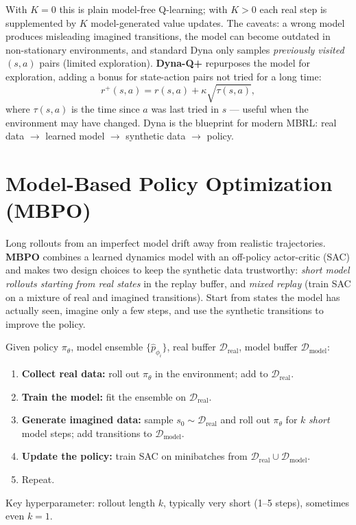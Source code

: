 \documentclass[11pt, oneside]{book}
\newcommand{\dataset}{\mathcal{D}}       %
\begin{document}
With $K=0$ this is plain model-free Q-learning; with $K>0$ each real step is supplemented by
$K$ model-generated value updates. The caveats: a wrong model produces misleading imagined
transitions, the model can become outdated in non-stationary environments, and standard Dyna
only samples \emph{previously visited} $(s,a)$ pairs (limited exploration).
\textbf{Dyna-Q+} repurposes the model for exploration, adding a bonus for state-action pairs
not tried for a long time:
\[
  r^+(s,a) = r(s,a) + \kappa\sqrt{\tau(s,a)},
\]
where $\tau(s,a)$ is the time since $a$ was last tried in $s$ --- useful when the
environment may have changed. Dyna is the blueprint for modern MBRL: real data $\to$
learned model $\to$ synthetic data $\to$ policy.

\section{Model-Based Policy Optimization (MBPO)}

Long rollouts from an imperfect model drift away from realistic trajectories. \textbf{MBPO}
combines a learned dynamics model with an off-policy actor-critic (SAC) and makes two design
choices to keep the synthetic data trustworthy: \emph{short model rollouts starting from
real states} in the replay buffer, and \emph{mixed replay} (train SAC on a mixture of real
and imagined transitions). Start from states the model has actually seen, imagine only a
few steps, and use the synthetic transitions to improve the policy.

\begin{thmbox}[title={MBPO}]
Given policy $\pi_\theta$, model ensemble $\{\hat p_{\phi_i}\}$, real buffer
$\dataset_{\text{real}}$, model buffer $\dataset_{\text{model}}$:
\begin{enumerate}
  \item \textbf{Collect real data:} roll out $\pi_\theta$ in the environment; add to
    $\dataset_{\text{real}}$.
  \item \textbf{Train the model:} fit the ensemble on $\dataset_{\text{real}}$.
  \item \textbf{Generate imagined data:} sample $s_0\sim\dataset_{\text{real}}$ and roll out
    $\pi_\theta$ for $k$ \emph{short} model steps; add transitions to $\dataset_{\text{model}}$.
  \item \textbf{Update the policy:} train SAC on minibatches from
    $\dataset_{\text{real}}\cup\dataset_{\text{model}}$.
  \item Repeat.
\end{enumerate}
Key hyperparameter: rollout length $k$, typically very short (1--5 steps), sometimes even
$k=1$.
\end{thmbox}
\end{document}

